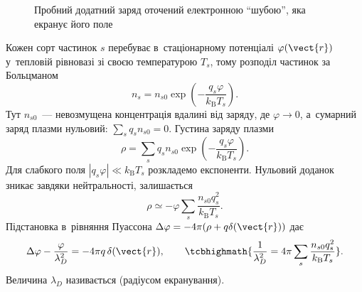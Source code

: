 \begin{figure}\centering
{}
\caption{Пробний додатний заряд оточений електронною \enquote{шубою}, яка екранує його
поле}
\label{tikz:debye-sphere}
\end{figure}

Кожен сорт частинок $s$ перебуває в~стаціонарному потенціалі $\varphi(\vect{r})$
у~тепловій рівновазі зі своєю температурою $T_s$, тому розподіл частинок за Больцманом
\begin{equation*}
	n_s=n_{s0}\exp\left(-\frac{q_s\varphi}{k_{\mathrm B}T_s}\right).
\end{equation*}
Тут $n_{s0}$~--- невозмущена концентрація вдалині від заряду, де $\varphi\to0$, а~сумарний
заряд плазми нульовий: $\sum_sq_sn_{s0}=0$. Густина заряду плазми
\begin{equation*}
	\rho=\sum_sq_sn_{s0}\exp\left(-\frac{q_s\varphi}{k_{\mathrm B}T_s}\right).
\end{equation*}
Для слабкого поля $|q_s\varphi|\ll k_{\mathrm B}T_s$ розкладемо експоненти. Нульовий
доданок зникає завдяки нейтральності, залишається
\begin{equation*}
	\rho\simeq-\varphi\sum_s\frac{n_{s0}q_s^2}{k_{\mathrm B}T_s}.
\end{equation*}
Підстановка в~рівняння Пуассона $\Delta\varphi=-4\pi(\rho+q\delta(\vect{r}))$ дає
\begin{equation}\label{eq:poisson-screened}
	\Delta\varphi-\frac{\varphi}{\lambda_D^2}=-4\pi q\,\delta(\vect{r}),
	\qquad
	\tcbhighmath{\frac{1}{\lambda_D^2}=4\pi\sum_s\frac{n_{s0}q_s^2}{k_{\mathrm B}T_s}}.
\end{equation}
Величина $\lambda_D$ називається  (радіусом екранування).

